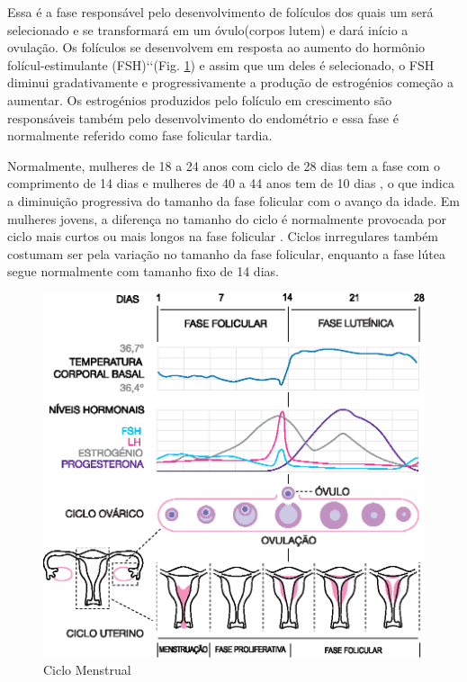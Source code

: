Essa é a fase responsável pelo desenvolvimento de folículos dos quais um será selecionado e se transformará em um óvulo(corpos lutem) e dará início a ovulação. Os folículos se desenvolvem em resposta ao aumento do hormônio folícul-estimulante (FSH)\lq\lq (Fig. \ref{fig01})  e assim que um deles é selecionado, o FSH diminui gradativamente e progressivamente a produção de estrogénios começão a aumentar. Os estrogénios produzidos pelo folículo em crescimento são responsáveis também pelo desenvolvimento do endométrio e essa fase é normalmente referido como fase folicular tardia.

Normalmente, mulheres de 18 a 24 anos com ciclo de 28 dias tem a fase com o comprimento de 14 dias e mulheres de 40 a 44 anos tem de 10 dias \cite{lenton1984a}, o que indica a diminuição progressiva do tamanho da fase folicular com o avanço da idade. Em mulheres jovens, a diferença no tamanho do ciclo é normalmente provocada por ciclo mais curtos ou mais longos na fase folicular \cite{lenton1984a}. Ciclos inrregulares também costumam ser pela variação no tamanho da fase folicular, enquanto a fase lútea segue normalmente com tamanho fixo de 14 dias.

\begin{figure}[h]
	\centering
	\includegraphics[keepaspectratio=true,scale=0.8]{figuras/MenstrualCycle2_pt.eps}
	\caption{Ciclo Menstrual}
        \label{fig01}
\end{figure}

